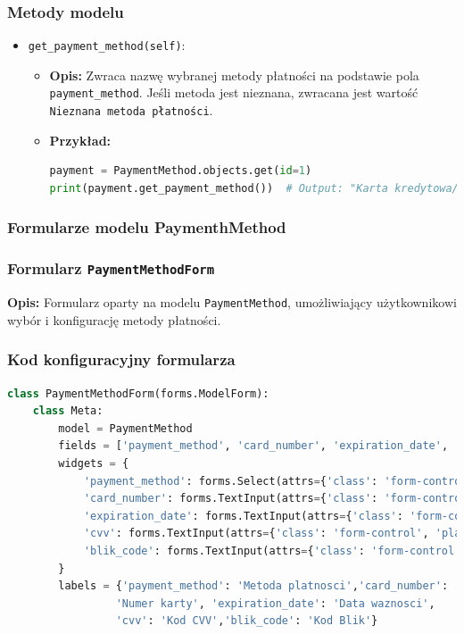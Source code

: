 \documentclass[12pt,a4paper,oneside]{article}
\theoremstyle{definition}
\numberwithin{equation}{section}
\begin{document}
\subsubsection{Metody modelu}
\begin{itemize}
    \item \texttt{get\_payment\_method(self)}:
    \begin{itemize}
        \item \textbf{Opis:} Zwraca nazwę wybranej metody płatności na podstawie pola \texttt{payment\_method}. Jeśli metoda jest nieznana, zwracana jest wartość \texttt{Nieznana metoda płatności}.
        \item \textbf{Przykład:}
        \begin{lstlisting}[language=Python]
payment = PaymentMethod.objects.get(id=1)
print(payment.get_payment_method())  # Output: "Karta kredytowa/debetowa"
        \end{lstlisting}
    \end{itemize}
\end{itemize}

\subsubsection{Formularze modelu PaymenthMethod}

\subsubsection*{Formularz \texttt{PaymentMethodForm}}
\textbf{Opis:}
Formularz oparty na modelu \texttt{PaymentMethod}, umożliwiający użytkownikowi wybór i konfigurację metody płatności.

\subsubsection*{Kod konfiguracyjny formularza}
\begin{lstlisting}[language=Python, caption=Konfiguracja formularza]
class PaymentMethodForm(forms.ModelForm):
    class Meta:
        model = PaymentMethod
        fields = ['payment_method', 'card_number', 'expiration_date', 'cvv', 'blik_code']
        widgets = {
            'payment_method': forms.Select(attrs={'class': 'form-control'}),
            'card_number': forms.TextInput(attrs={'class': 'form-control', 'placeholder': 'Wprowadz numer karty'}),
            'expiration_date': forms.TextInput(attrs={'class': 'form-control', 'placeholder': 'MM/RR'}),
            'cvv': forms.TextInput(attrs={'class': 'form-control', 'placeholder': 'CVV'}),
            'blik_code': forms.TextInput(attrs={'class': 'form-control', 'placeholder': 'Kod Blik'}),
        }
        labels = {'payment_method': 'Metoda platnosci','card_number':
                 'Numer karty', 'expiration_date': 'Data waznosci',
                 'cvv': 'Kod CVV','blik_code': 'Kod Blik'}
\end{lstlisting}
\end{document}

